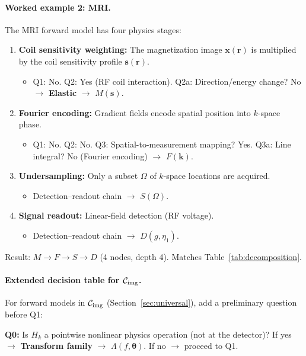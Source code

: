 \paragraph{Worked example 2: MRI.}
The MRI forward model has four physics stages:
\begin{enumerate}
  \item \textbf{Coil sensitivity weighting:} The magnetization image $\mathbf{x}(\mathbf{r})$ is multiplied by the coil sensitivity profile $\mathbf{s}(\mathbf{r})$.
  \begin{itemize}
    \item Q1: No. Q2: Yes (RF coil interaction). Q2a: Direction/energy change? No $\to$ \textbf{Elastic} $\to$ $M(\mathbf{s})$.
  \end{itemize}
  \item \textbf{Fourier encoding:} Gradient fields encode spatial position into $k$-space phase.
  \begin{itemize}
    \item Q1: No. Q2: No. Q3: Spatial-to-measurement mapping? Yes. Q3a: Line integral? No (Fourier encoding) $\to$ $F(\mathbf{k})$.
  \end{itemize}
  \item \textbf{Undersampling:} Only a subset $\Omega$ of $k$-space locations are acquired.
  \begin{itemize}
    \item Detection--readout chain $\to$ $S(\Omega)$.
  \end{itemize}
  \item \textbf{Signal readout:} Linear-field detection (RF voltage).
  \begin{itemize}
    \item Detection--readout chain $\to$ $D(g, \eta_1)$.
  \end{itemize}
\end{enumerate}
Result: $M \to F \to S \to D$ (4 nodes, depth 4). Matches Table~\ref{tab:decomposition}.

\paragraph{Extended decision table for $\mathcal{C}_{\mathrm{img}}$.}
For forward models in $\mathcal{C}_{\mathrm{img}}$ (Section~\ref{sec:universal}), add a preliminary question before Q1:

\medskip
\noindent\textbf{Q0:} Is $H_k$ a pointwise nonlinear physics operation (not at the detector)? If yes $\to$ \textbf{Transform family} $\to$ $\Lambda(f, \boldsymbol{\theta})$. If no $\to$ proceed to Q1.

